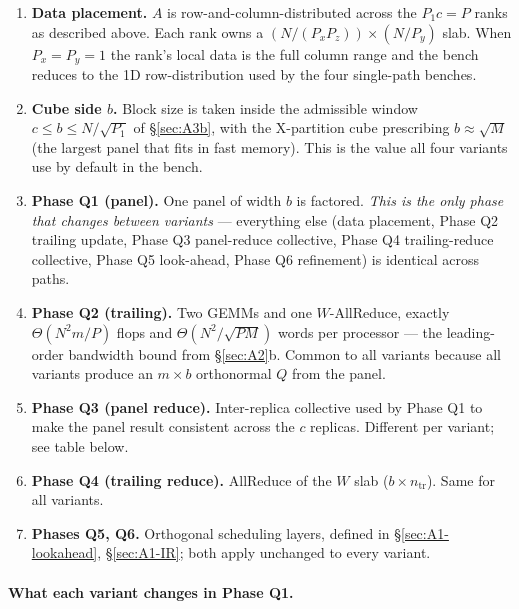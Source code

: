 \documentclass[11pt]{article}
\begin{document}
\medskip
\begin{enumerate}[leftmargin=2em, itemsep=0.25em]
  \item \textbf{Data placement.} $A$ is row-and-column-distributed
        across the $P_1 c = P$ ranks as described above.  Each rank owns
        a $(N/(P_x P_z)) \times (N/P_y)$ slab.  When $P_x = P_y = 1$ the
        rank's local data is the full column range and the bench reduces
        to the 1D row-distribution used by the four single-path benches.
  \item \textbf{Cube side $b$.}  Block size is taken inside the
        admissible window $c \le b \le N / \sqrt{P_1}$ of
        \S\ref{sec:A3b}, with the X-partition cube prescribing
        $b \approx \sqrt{M}$ (the largest panel that fits in fast
        memory).  This is the value all four variants use by default
        in the bench.
  \item \textbf{Phase Q1 (panel).}  One panel of width $b$ is factored.
        \emph{This is the only phase that changes between variants}
        --- everything else (data placement, Phase Q2 trailing update,
        Phase Q3 panel-reduce collective, Phase Q4 trailing-reduce
        collective, Phase Q5 look-ahead, Phase Q6 refinement) is
        identical across paths.
  \item \textbf{Phase Q2 (trailing).}  Two GEMMs and one
        $W$-AllReduce, exactly $\Theta(N^2 m / P)$ flops and
        $\Theta(N^2/\sqrt{P M})$ words per processor --- the
        leading-order bandwidth bound from \S\ref{sec:A2}b.  Common to
        all variants because all variants produce an $m\times b$
        orthonormal $Q$ from the panel.
  \item \textbf{Phase Q3 (panel reduce).}  Inter-replica collective
        used by Phase Q1 to make the panel result consistent across
        the $c$ replicas.  Different per variant; see table below.
  \item \textbf{Phase Q4 (trailing reduce).}  AllReduce of the
        $W$ slab ($b \times n_{\mathrm{tr}}$).  Same for all variants.
  \item \textbf{Phases Q5, Q6.}  Orthogonal scheduling layers, defined
        in \S\ref{sec:A1-lookahead}, \S\ref{sec:A1-IR}; both apply
        unchanged to every variant.
\end{enumerate}

\paragraph{What each variant changes in Phase Q1.}
\end{document}
